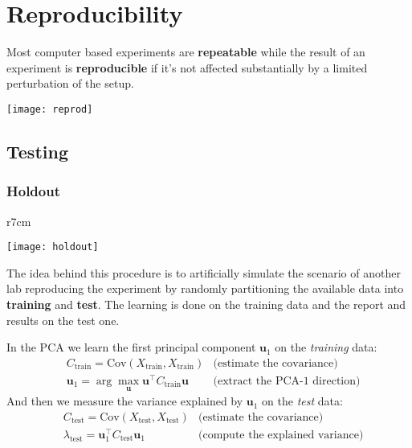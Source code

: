 \newpage
\section{Reproducibility}
Most computer based experiments are \textbf{repeatable} while the result of an experiment is \textbf{reproducible} if it's not affected substantially by a limited perturbation of the setup.
\begin{center}
	\texttt{[image: reprod]}
\end{center}

\subsection{Testing}
\subsubsection{Holdout}
\begin{wrapfigure}[6]{r}{7cm}
	\vspace{-1.3cm}
	\begin{center}
		\texttt{[image: holdout]}
	\end{center}
\end{wrapfigure}
The idea behind this procedure is to artificially simulate the scenario of another lab reproducing the experiment by randomly partitioning  the available data into \textbf{training} and \textbf{test}. The learning is done on the training data  and the report and results on the test one.

\begin{example}[PCA]
	In the PCA we learn the first principal component $\mathbf{u}_1$ on the \textit{training} data:
	\begin{align*}
		& C_{\text{train}} = \text{Cov}(X_{\text{train}}, X_{\text{train}}) &\text{(estimate the covariance)}\\
		& \mathbf{u}_1 = \arg\max_\mathbf{u} \mathbf{u}^\top C_\text{train} \mathbf{u} & \text{(extract the PCA-1 direction)}
	\end{align*}
	And then we measure the variance explained by $\mathbf{u}_1$ on the \textit{test} data:
	\begin{align*}
		& C_\text{test} = \text{Cov}(X_\text{test}, X_\text{test}) & \text{(estimate the covariance)} \\
		& \lambda_\text{test} = \mathbf{u}_1^\top C_\text{test} \mathbf{u}_1 & \text{(compute the explained variance)}
	\end{align*}
\end{example}

